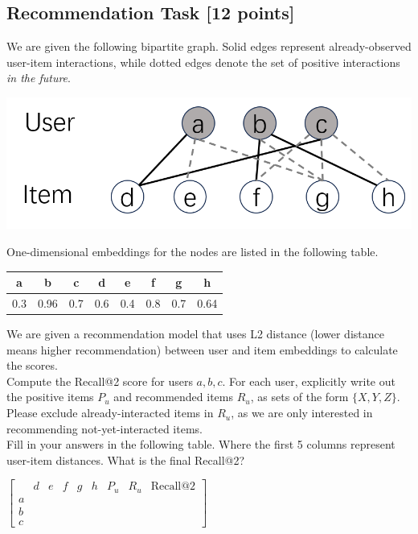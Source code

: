\documentclass[11pt]{article}
\begin{document}
    \subsection{Recommendation Task [12 points]}%
     We are given the following bipartite graph. Solid edges represent already-observed user-item interactions, while dotted edges denote the set of positive interactions \emph{in the future}.
    \begin{center}
    \includegraphics[scale = 0.35]{CS224W_Homework3/3.4.png}
    \end{center}
    One-dimensional embeddings for the nodes are listed in the following table.
    \begin{center}
    \begin{tabular}{|c|c|c|c|c|c|c|c|}
    \hline
    a & b & c & d & e & f & g & h\\ [0.5ex]
    \hline
    0.3 & 0.96 & 0.7 & 0.6 & 0.4 & 0.8 & 0.7 & 0.64 \\
    \hline
    \end{tabular}
    \end{center}
    We are given a recommendation model that uses L2 distance (lower distance means higher recommendation) between user and item embeddings to calculate the scores.\\

    \noindent Compute the Recall@2 score for users $a, b, c$. For each user, explicitly write out the positive items $P_{u}$ and recommended items $R_{u}$, as sets of the form $\{ X,Y,Z \}$. Please exclude already-interacted items in $R_{u}$, as we are only interested in recommending not-yet-interacted items.\\

    \noindent Fill in your answers in the following table. Where the first 5 columns represent user-item distances. What is the final Recall@2?
    \vspace{0.5cm}
    
    $\begin{bmatrix}
      & d & e & f & g & h & P_{u} & R_{u} & \text{Recall@2} \\
    a &  & &  &  &  &  & &  \\
    b &  &  &  & &  & &  &  \\
    c &  &  &  &  &  & & &
    \end{bmatrix}$
    \vspace{0.5cm}
    
\end{document}
